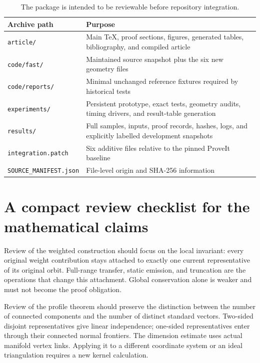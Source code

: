 \documentclass[11pt,a4paper]{article}
\theoremstyle{definition}
\theoremstyle{remark}
\newcommand{\code}[1]{\texttt{#1}}
\begin{document}
\begin{table}[htbp]
\centering\small
\begin{tabularx}{\textwidth}{@{}p{}Y@{}}
\toprule
Archive path & Purpose\\
\midrule
\code{article/} & Main TeX, proof sections, figures, generated tables,
bibliography, and compiled article\\
\code{code/fast/} & Maintained source snapshot plus the six new geometry files\\
\code{code/reports/} & Minimal unchanged reference fixtures required by historical tests\\
\code{experiments/} & Persistent prototype, exact tests, geometry audits,
timing drivers, and result-table generation\\
\code{results/} & Full samples, inputs, proof records, hashes, logs,
and explicitly labelled development snapshots\\
\code{integration.patch} & Six additive files relative to the pinned ProveIt baseline\\
\code{SOURCE\_MANIFEST.json} & File-level origin and SHA-256 information\\
\bottomrule
\end{tabularx}
\caption{The package is intended to be reviewable before repository integration.}
\end{table}

\section{A compact review checklist for the mathematical claims}

Review of the weighted construction should focus on the local invariant:
every original weight contribution stays attached to exactly one current
representative of its original orbit. Full-range transfer, static emission,
and truncation are the operations that change this attachment. Global
conservation alone is weaker and must not become the proof obligation.

Review of the profile theorem should preserve the distinction between
the number of connected components and the number of distinct standard
vectors. Two-sided disjoint representatives give linear independence;
one-sided representatives enter through their connected normal frontiers.
The dimension estimate uses actual manifold vertex links. Applying it to
a different coordinate system or an ideal triangulation requires a new
kernel calculation.
\end{document}
